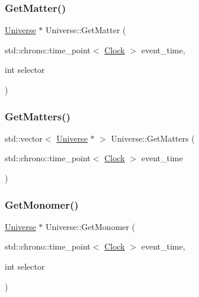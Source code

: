 \subsubsection{\texorpdfstring{Get\+Matter()}{GetMatter()}}
{\footnotesize\ttfamily \mbox{\hyperlink{classUniverse}{Universe}} $\ast$ Universe\+::\+Get\+Matter (\begin{DoxyParamCaption}\item[{std\+::chrono\+::time\+\_\+point$<$ \mbox{\hyperlink{universe_8h_a0ef8d951d1ca5ab3cfaf7ab4c7a6fd80}{Clock}} $>$}]{event\+\_\+time,  }\item[{int}]{selector }\end{DoxyParamCaption})}

\mbox{\label{classUniverse_a4307a62e183fed8cf2b92be0f6014688}} 
\subsubsection{\texorpdfstring{Get\+Matters()}{GetMatters()}}
{\footnotesize\ttfamily std\+::vector$<$ \mbox{\hyperlink{classUniverse}{Universe}} $\ast$ $>$ Universe\+::\+Get\+Matters (\begin{DoxyParamCaption}\item[{std\+::chrono\+::time\+\_\+point$<$ \mbox{\hyperlink{universe_8h_a0ef8d951d1ca5ab3cfaf7ab4c7a6fd80}{Clock}} $>$}]{event\+\_\+time }\end{DoxyParamCaption})}

\mbox{\label{classUniverse_aaa03fb8178d790afd992dd094bb64b47}} 
\subsubsection{\texorpdfstring{Get\+Monomer()}{GetMonomer()}}
{\footnotesize\ttfamily \mbox{\hyperlink{classUniverse}{Universe}} $\ast$ Universe\+::\+Get\+Monomer (\begin{DoxyParamCaption}\item[{std\+::chrono\+::time\+\_\+point$<$ \mbox{\hyperlink{universe_8h_a0ef8d951d1ca5ab3cfaf7ab4c7a6fd80}{Clock}} $>$}]{event\+\_\+time,  }\item[{int}]{selector }\end{DoxyParamCaption})}


